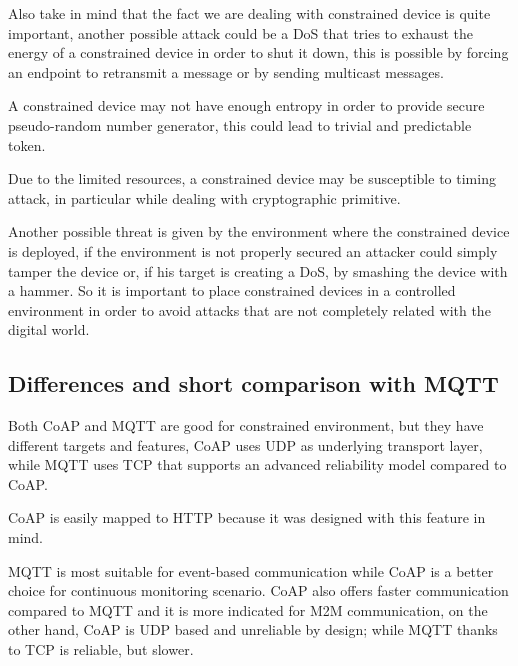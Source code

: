 	Also take in mind that the fact we are dealing with constrained device is quite important, another possible attack could be a DoS that tries to exhaust the energy of a constrained device in order to shut it down, this is possible by forcing an endpoint to retransmit a message or by sending multicast messages.\newline
	
	A constrained device may not have enough entropy in order to provide secure pseudo-random number generator, this could lead to trivial and predictable token.\newline
	
	Due to the limited resources, a constrained device may be susceptible to timing attack, in particular while dealing with cryptographic primitive.\newline
	
	Another possible threat is given by the environment where the constrained device is deployed, if the environment is not properly secured an attacker could simply tamper the device or, if his target is creating a DoS, by smashing the device with a hammer.\newline
	So it is important to place constrained devices in a controlled environment in order to avoid attacks that are not completely related with the digital world.\newline
	
	\subsection{Differences and short comparison with MQTT}
	Both CoAP and MQTT are good for constrained environment, but they have different targets and features, CoAP uses UDP as underlying transport layer, while MQTT uses TCP that supports an advanced reliability model compared to CoAP.\newline
	
	CoAP is easily mapped to HTTP because it was designed with this feature in mind.\newline
	
	MQTT is most suitable for event-based communication while CoAP is a better choice for continuous monitoring scenario.\newline
	CoAP also offers faster communication compared to MQTT and it is more indicated for M2M communication, on the other hand, CoAP is UDP based and unreliable by design; while MQTT thanks to TCP is reliable, but slower.\newline
	
